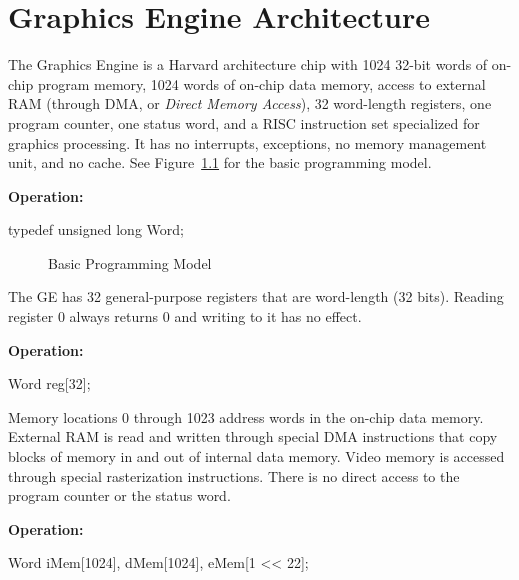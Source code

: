 \documentclass{book}
\begin{document}
\chapter{Graphics Engine Architecture}

The Graphics Engine is a Harvard architecture chip with 1024 32-bit
words of on-chip program memory, 1024 words of on-chip data memory,
access to external RAM (through DMA, or {\em Direct Memory Access}),
32 word-length registers, one program counter, one status word, and a
RISC instruction set specialized for graphics processing.  It has no
interrupts, exceptions, no memory management unit, and no cache.  See
Figure~\ref{fig:progmodel} for the basic programming model.

\begin{indented}{\bf Operation:}\vspace{.8ex}
\begin{verbatimtab}
typedef unsigned long Word;
\end{verbatimtab}
\end{indented}

\begin{figure}
{}
\caption{\label{fig:progmodel}Basic Programming Model}
\end{figure}


The GE has 32 general-purpose registers that are word-length (32 bits).
Reading register 0 always returns 0 and writing to it has no effect.

\begin{indented}{\bf Operation:}\vspace{.8ex}
\begin{verbatimtab}
Word reg[32];
\end{verbatimtab}
\end{indented}


Memory locations 0 through 1023 address words in the on-chip data
memory.  External RAM is read and written through special DMA
instructions that copy blocks of memory in and out of internal data
memory.  Video memory is accessed through special rasterization
instructions.  There is no direct access to the program counter or the
status word.

\begin{indented}{\bf Operation:}\vspace{.8ex}
\begin{verbatimtab}
Word iMem[1024], dMem[1024], eMem[1 << 22];
\end{verbatimtab}
\end{indented}
\end{document}
